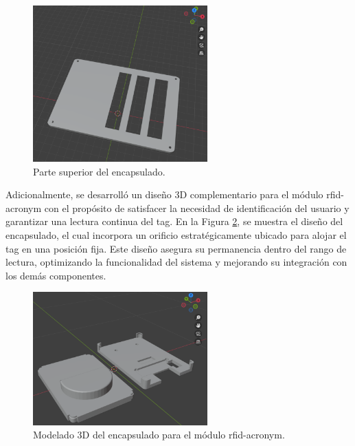 \begin{figure}[H]
\leavevmode
\begin{minipage}{\textwidth}
\begin{center}
\includegraphics[width=0.6\textwidth]{./capitulo_04/imagen/tapa.png}
\caption{Parte superior del encapsulado.\label{fig:tapa}}
\end{center}
\end{minipage}
\end{figure}


Adicionalmente, se desarrolló un diseño 3D complementario para el módulo \acrshort{rfid-acronym} con el propósito de satisfacer la necesidad de identificación del usuario y garantizar una lectura continua del tag. En la Figura \ref{fig:orificio}, se muestra el diseño del encapsulado, el cual incorpora un orificio estratégicamente ubicado para alojar el tag en una posición fija. Este diseño asegura su permanencia dentro del rango de lectura, optimizando la funcionalidad del sistema y mejorando su integración con los demás componentes.

\begin{figure}[H]
\leavevmode
\begin{minipage}{\textwidth}
\begin{center}
\includegraphics[width=0.6\textwidth]{./capitulo_04/imagen/rfidcaseblender.png}
\caption{Modelado 3D del encapsulado para el módulo \acrshort{rfid-acronym}.\label{fig:orificio}}
\end{center}
\end{minipage}
\end{figure}